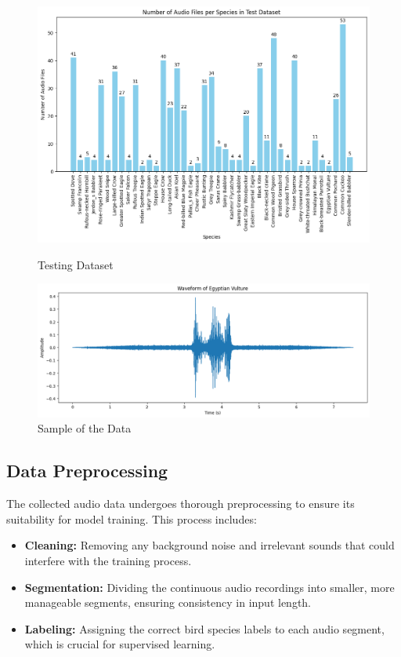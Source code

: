     \begin{figure}[h]
        \centering
        \begin{minipage}[b]{0.45\linewidth}
            \includegraphics[width=\linewidth]{images/TestDataset.png}
            \caption{Testing Dataset}
        \end{minipage}
        \hspace{1cm}
        \begin{minipage}[b]{0.45\linewidth}
            \includegraphics[width=\linewidth]{images/SampleData.png}
            \caption{Sample of the Data}
        \end{minipage}
        
    \end{figure}
\subsection{Data Preprocessing}

The collected audio data undergoes thorough preprocessing to ensure its suitability for model training. This process includes:
\begin{itemize}
    \item \textbf{Cleaning:} Removing any background noise and irrelevant sounds that could interfere with the training process.
    \item \textbf{Segmentation:} Dividing the continuous audio recordings into smaller, more manageable segments, ensuring consistency in input length.
    \item \textbf{Labeling:} Assigning the correct bird species labels to each audio segment, which is crucial for supervised learning.
\end{itemize}

